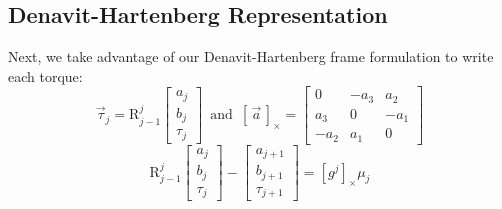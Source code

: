 \documentclass[letterpaper,12pt]{article}
\newcommand{\R}[2]{{\mbox{R}}^{#1}_{#2}}
\begin{document}
   \subsection{Denavit-Hartenberg Representation}
      Next, we take advantage of our Denavit-Hartenberg frame formulation
      to write each torque:
      \begin{equation}
         \vec\tau_j =
            \R{j}{j-1}
            \left[
               \begin{array}{c}
               a_j \\ b_j \\ \tau_j
               \end{array}
            \right]
         \,\,\,\mbox{and}\,\,\,
            \left[ \,\vec{a}\, \right]_{\times}
            = \left[ \begin{array}{ccc}
               0 & -a_3 & a_2 \\ a_3 & 0 & -a_1 \\ -a_2 & a_1 & 0
            \end{array} \right]
      \end{equation}
      \begin{equation}
         \R{j}{j-1}
         \left[
            \begin{array}{c}
            a_j \\ b_j \\ \tau_j
            \end{array}
         \right]
         -
         \left[
            \begin{array}{c}
            a_{j+1} \\ b_{j+1} \\ \tau_{j+1}
            \end{array}
         \right]
         = \left[ g^j \right]_{\times} \mu_j
      \end{equation}
      
\end{document}
